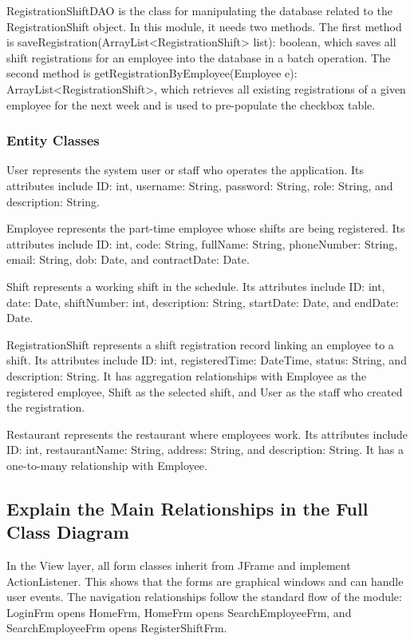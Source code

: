 RegistrationShiftDAO is the class for manipulating the database related to the RegistrationShift object. In this module, it needs two methods. The first method is saveRegistration(ArrayList<RegistrationShift> list): boolean, which saves all shift registrations for an employee into the database in a batch operation. The second method is getRegistrationByEmployee(Employee e): ArrayList<RegistrationShift>, which retrieves all existing registrations of a given employee for the next week and is used to pre-populate the checkbox table.

\subsubsection{Entity Classes}

User represents the system user or staff who operates the application. Its attributes include ID: int, username: String, password: String, role: String, and description: String.

Employee represents the part-time employee whose shifts are being registered. Its attributes include ID: int, code: String, fullName: String, phoneNumber: String, email: String, dob: Date, and contractDate: Date.

Shift represents a working shift in the schedule. Its attributes include ID: int, date: Date, shiftNumber: int, description: String, startDate: Date, and endDate: Date.

RegistrationShift represents a shift registration record linking an employee to a shift. Its attributes include ID: int, registeredTime: DateTime, status: String, and description: String. It has aggregation relationships with Employee as the registered employee, Shift as the selected shift, and User as the staff who created the registration.

Restaurant represents the restaurant where employees work. Its attributes include ID: int, restaurantName: String, address: String, and description: String. It has a one-to-many relationship with Employee.

\subsection{Explain the Main Relationships in the Full Class Diagram}

In the View layer, all form classes inherit from JFrame and implement ActionListener. This shows that the forms are graphical windows and can handle user events. The navigation relationships follow the standard flow of the module: LoginFrm opens HomeFrm, HomeFrm opens SearchEmployeeFrm, and SearchEmployeeFrm opens RegisterShiftFrm.

